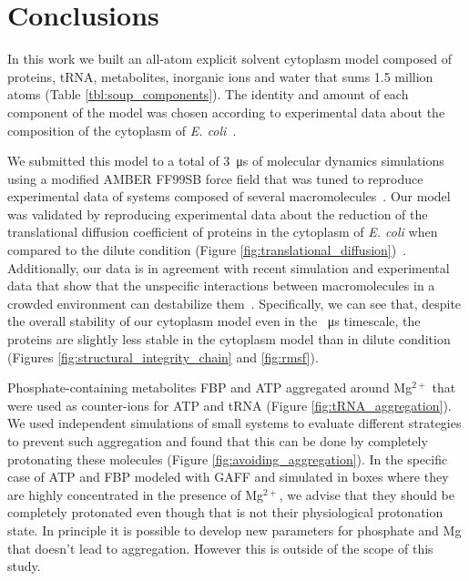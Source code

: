 \documentclass[journal=jacsat,manuscript=article]{achemso}
\begin{document}
\section*{Conclusions}\label{sec:concl}

In this work we built an all-atom explicit solvent cytoplasm model composed of proteins, tRNA, metabolites, inorganic ions and water that sums 1.5 million atoms (Table \ref{tbl:soup_components}). The identity and amount of each component of the model was chosen according to experimental data about the composition of the cytoplasm of \textit{E. coli}~\cite{Dong1996,Bennett2009,Link1997,Mcguffee2010}.

We submitted this model to a total of \SI{3}{\micro\second} of molecular dynamics simulations using a modified AMBER FF99SB force field that was tuned to reproduce experimental data of systems composed of several macromolecules~\cite{Best2014a}. Our model was validated by reproducing experimental data about the reduction of the translational diffusion coefficient of proteins in the cytoplasm of \textit{E. coli} when compared to the dilute condition (Figure \ref{fig:translational_diffusion})~\cite{Elowitz1999,Konopka2006}. Additionally, our data is in agreement with recent simulation and experimental data that show that the unspecific interactions between macromolecules in a crowded environment can destabilize them~\cite{Feig2011,miklos2011,Wang2012b}. Specifically, we can see that, despite the overall stability of our cytoplasm model even in the \SI{}{\micro\second} timescale, the proteins are slightly less stable in  the cytoplasm model than in dilute condition (Figures \ref{fig:structural_integrity_chain} and \ref{fig:rmsf}).


Phosphate-containing metabolites FBP and ATP aggregated around Mg$^{2+}$ that were used as counter-ions for ATP and tRNA (Figure \ref{fig:tRNA_aggregation}). We used independent simulations of small systems to evaluate different strategies to prevent such aggregation and found that this can be done by completely protonating these molecules (Figure \ref{fig:avoiding_aggregation}). In the specific case of ATP and FBP modeled with GAFF and simulated in boxes where they are highly concentrated in the presence of Mg$^{2+}$, we advise that they should be completely protonated even though that is not their physiological protonation state. In principle it is possible to develop new parameters for phosphate and Mg that doesn't lead to aggregation. However this is outside of the scope of this study.
\end{document}
